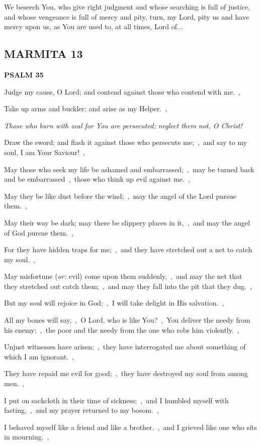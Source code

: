 \documentclass[12pt,twoside,a5paper]{article}
\newcommand{\marmita}[1]{\subsection*{MARMITA {#1}}}
\newcommand{\psalm}[1]{\textbf{PSALM {#1}}\nopagebreak}
\newcommand{\qanona}[1]{{\liturgicalhint{Qanona.} \emph{#1}}}
\newcommand{\slota}[1]{\liturgicalhint{Slota.} #1}
\newcommand{\translationoption}[1]{\emph{or:} #1}
\begin{document}
\slota{We beseech You, who give right judgment and whose searching is full of justice, and whose vengeance is full of mercy and pity, turn, my Lord, pity us and have mercy upon us, as You are used to, at all times, Lord of...}

\marmita{13}

\psalm{35}

\begin{normalparskip}
  Judge my cause, O Lord; and contend against those who contend with me.~\sep

  Take up arms and buckler; and arise as my Helper.~\sep

  \qanona{Those who burn with zeal for You are persecuted; neglect them not, O Christ!}

  Draw the sword; and flash it against those who persecute me;~\sep\ and say to my soul, I am Your Saviour!~\sep

  May those who seek my life be ashamed and embarrassed;~\sep\ may be turned back and be embarrassed~\sep\ those who think up evil against me.~\sep

  May they be like dust before the wind;~\sep\ may the angel of the Lord pursue them.~\sep

  May their way be dark; may there be slippery places in it,~\sep\ and may the angel of God pursue them.~\sep

  For they have hidden traps for me;~\sep\ and they have stretched out a net to catch my soul.~\sep

  May misfortune (\translationoption{evil}) come upon them suddenly,~\sep\ and may the net that they stretched out catch them;~\sep\ and may they fall into the pit that they dug.~\sep

  But my soul will rejoice in God;~\sep\ I will take delight in His salvation.~\sep

  All my bones will say,~\sep\ O Lord, who is like You?~\sep\ You deliver the needy from his enemy;~\sep\ the poor and the needy from the one who robs him violently.~\sep

  Unjust witnesses have arisen;~\sep\ they have interrogated me about something of which I am ignorant.~\sep

  They have repaid me evil for good;~\sep\ they have destroyed my soul from among men.~\sep

  I put on sackcloth in their time of sickness;~\sep\ and I humbled myself with fasting,~\sep\ and my prayer returned to my bosom.~\sep

  I behaved myself like a friend and like a brother.~\sep\ and I grieved like one who sits in mourning.~\sep


\end{normalparskip}
\end{document}
